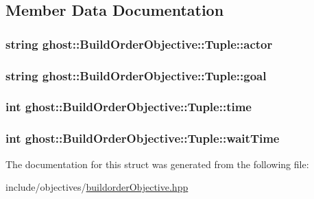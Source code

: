 \subsection{Member Data Documentation}
\hypertarget{structghost_1_1BuildOrderObjective_1_1Tuple_a3e53211ec4154162d687c95b315d2c18}{
\subsubsection[{actor}]{\setlength{\rightskip}{0pt plus 5cm}string ghost\-::\-Build\-Order\-Objective\-::\-Tuple\-::actor}}\label{structghost_1_1BuildOrderObjective_1_1Tuple_a3e53211ec4154162d687c95b315d2c18}
\hypertarget{structghost_1_1BuildOrderObjective_1_1Tuple_ab6d651fc9c2618fb4b6a97df7909c521}{
\subsubsection[{goal}]{\setlength{\rightskip}{0pt plus 5cm}string ghost\-::\-Build\-Order\-Objective\-::\-Tuple\-::goal}}\label{structghost_1_1BuildOrderObjective_1_1Tuple_ab6d651fc9c2618fb4b6a97df7909c521}
\hypertarget{structghost_1_1BuildOrderObjective_1_1Tuple_aec2af8e329fe4c3929d9a54462b92476}{
\subsubsection[{time}]{\setlength{\rightskip}{0pt plus 5cm}int ghost\-::\-Build\-Order\-Objective\-::\-Tuple\-::time}}\label{structghost_1_1BuildOrderObjective_1_1Tuple_aec2af8e329fe4c3929d9a54462b92476}
\hypertarget{structghost_1_1BuildOrderObjective_1_1Tuple_acf901355f413337aa9b553e89eedd491}{
\subsubsection[{wait\-Time}]{\setlength{\rightskip}{0pt plus 5cm}int ghost\-::\-Build\-Order\-Objective\-::\-Tuple\-::wait\-Time}}\label{structghost_1_1BuildOrderObjective_1_1Tuple_acf901355f413337aa9b553e89eedd491}


The documentation for this struct was generated from the following file\-:\begin{DoxyCompactItemize}
\item 
include/objectives/\hyperlink{buildorderObjective_8hpp}{buildorder\-Objective.\-hpp}\end{DoxyCompactItemize}
